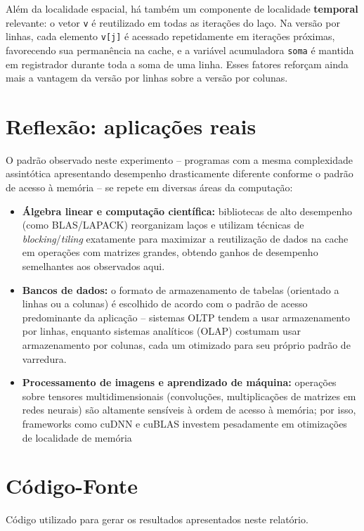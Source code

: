 \documentclass[a4paper,12pt]{article}
\begin{document}
Além da localidade espacial, há também um componente de localidade
\textbf{temporal} relevante: o vetor \texttt{v} é reutilizado em todas as
iterações do laço. Na versão por linhas, cada elemento \texttt{v[j]} é acessado
repetidamente em iterações próximas, favorecendo sua permanência na cache, e a
variável acumuladora \texttt{soma} é mantida em registrador durante toda a soma
de uma linha. Esses fatores reforçam ainda mais a vantagem da versão por linhas
sobre a versão por colunas.

\section{Reflexão: aplicações reais}

O padrão observado neste experimento -- programas com a mesma complexidade
assintótica apresentando desempenho drasticamente diferente conforme o padrão
de acesso à memória -- se repete em diversas áreas da computação:

\begin{itemize}
    \item \textbf{Álgebra linear e computação científica:} bibliotecas de alto
    desempenho (como BLAS/LAPACK) reorganizam laços e utilizam técnicas de
    \emph{blocking}/\emph{tiling} exatamente para maximizar a reutilização de
    dados na cache em operações com matrizes grandes, obtendo ganhos de
    desempenho semelhantes aos observados aqui.

    \item \textbf{Bancos de dados:} o formato de armazenamento de tabelas
    (orientado a linhas ou a colunas) é escolhido de acordo com o padrão de
    acesso predominante da aplicação -- sistemas OLTP tendem a usar
    armazenamento por linhas, enquanto sistemas analíticos (OLAP) costumam usar
    armazenamento por colunas, cada um otimizado para seu próprio padrão de
    varredura.

    \item \textbf{Processamento de imagens e aprendizado de máquina:} operações
    sobre tensores multidimensionais (convoluções, multiplicações de matrizes em
    redes neurais) são altamente sensíveis à ordem de acesso à memória; por
    isso, frameworks como cuDNN e cuBLAS investem pesadamente em otimizações de
    localidade de memória
\end{itemize}

\newpage
\appendix

\section{Código-Fonte}

Código utilizado para gerar os resultados apresentados neste relatório.


\end{document}
